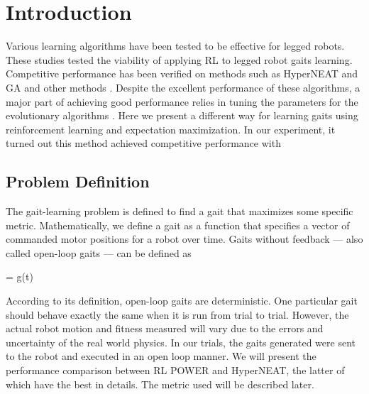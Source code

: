 \section{Introduction}


Various learning algorithms have been tested to be effective for
legged robots. These studies tested the viability of applying RL to legged robot gaits learning. Competitive performance has
been verified on methods such as HyperNEAT \cite{yosinski2011evolving-robot-gaits} and
GA \cite{chernova2004an-evolutionary-approach-to-gait} and other methods \cite{hornby2005autonomous-evolution-of-dynamic} \cite{zykov2004evolving-dynamic-gaits} \cite{tellez2006evolving-the-walking-behaviour} \cite{valsalam2008modular-neuroevolution-for-multilegged}. Despite the excellent performance of these algorithms, a major
part of achieving good performance relies in tuning the parameters for
the evolutionary algorithms \cite{kormushev2011bipedal-walking-energya}. Here we present a
different way for learning gaits using reinforcement learning and expectation maximization. In our
experiment, it turned out this method achieved competitive performance
with 

\subsection{Problem Definition}
The gait-learning problem is defined to find a
gait that maximizes some specific metric. Mathematically, we define a
gait as a function that specifies a vector of commanded motor
positions for a robot over time. Gaits without feedback --- also
called open-loop gaits --- can be defined as

\be{} = g(t)\ee

According to its definition, open-loop gaits are deterministic. One
particular gait should behave exactly the same when it is run from
trial to trial. However, the actual robot motion and fitness measured
will vary due to the errors and uncertainty of the real world physics. In our
trials, the gaits generated were sent to the robot and
executed in an open loop manner. We will present the performance comparison between
RL POWER and HyperNEAT, the latter of which have the best in details. The metric used will be
described later.
